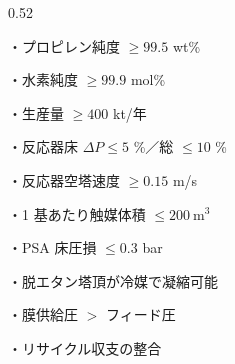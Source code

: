 \begin{frame}[t]
\begin{columns}[T,onlytextwidth]
\begin{column}{0.52\textwidth}
      \vspace{0.35em}
      \par
      \vspace{0.18em}
      {\footnotesize\linespread{0.92}\selectfont\raggedright
       {\color{SpGreen}・プロピレン純度 $\ge 99.5$ wt\%}\par
       ・水素純度 $\ge 99.9$ mol\%\par
       {\color{SpGreen}・生産量 $\ge 400$ kt/年}\par
       ・反応器床 $\Delta P \le 5$ \%／総 $\le 10$ \%\par
       ・反応器空塔速度 $\ge 0.15$ m/s\par
       ・1 基あたり触媒体積 $\le 200\ \mathrm{m^3}$\par
       ・PSA 床圧損 $\le 0.3$ bar\par
       ・脱エタン塔頂が冷媒で凝縮可能\par
       ・膜供給圧 $>$ フィード圧\par
       ・リサイクル収支の整合\par}
    \end{column}


\end{columns}
\end{frame}
